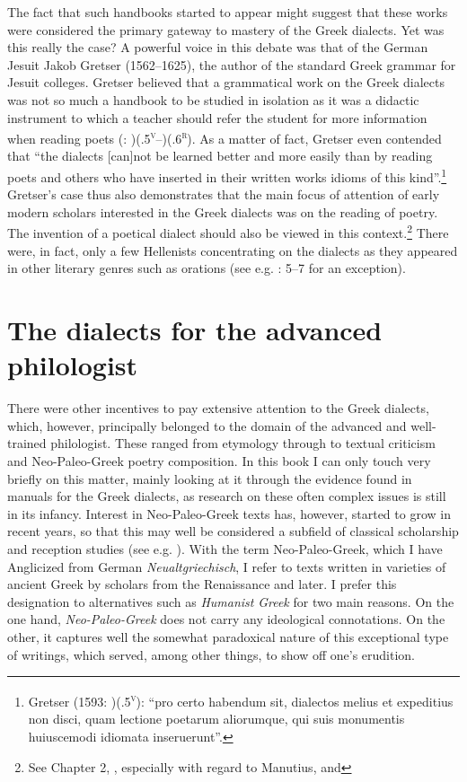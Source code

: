 The fact that such handbooks started to appear might suggest that these works were considered the primary gateway to mastery of the Greek dialects. Yet was this really the case? A powerful voice in this debate was that of the German Jesuit Jakob Gretser (1562–1625), the author of the standard Greek grammar for Jesuit colleges. Gretser believed that a grammatical work on the Greek dialects was not so much a handbook to be studied in isolation as it was a didactic instrument to which a teacher should refer the student for more information when reading poets (\citealt{Gretser1593}: )(.5\textsc{\textsuperscript{v}}–)(.6\textsc{\textsuperscript{r}}). As a matter of fact, Gretser even contended that “the dialects [can]not be learned better and more easily than by reading poets and others who have inserted in their written works idioms of this kind”.\footnote{Gretser (1593: )(.5\textsc{\textsuperscript{v}}): “pro certo habendum sit, dialectos melius et expeditius non disci, quam lectione poetarum aliorumque, qui suis monumentis huiuscemodi idiomata inseruerunt”.} Gretser’s case thus also demonstrates that the main focus of attention of early modern scholars interested in the Greek dialects was on the reading of poetry. The invention of a poetical dialect should also be viewed in this context.\footnote{See Chapter 2, , especially with regard to Manutius, and } There were, in fact, only a few Hellenists concentrating on the dialects as they appeared in other literary genres such as orations (see e.g. \citealt{Labbe1639}: 5–7 for an exception).

\section{The dialects for the advanced philologist}

There were other incentives to pay extensive attention to the Greek dialects, which, however, principally belonged to the domain of the advanced and well-trained philologist. These ranged from etymology through to textual criticism and Neo-Paleo-Greek poetry composition. In this book I can only touch very briefly on this matter, mainly looking at it through the evidence found in manuals for the Greek dialects, as research on these often complex issues is still in its infancy. Interest in Neo-Paleo-Greek texts has, however, started to grow in recent years, so that this may well be considered a subfield of classical scholarship and reception studies (see e.g. \citealt{PällVolt2018}). With the term Neo-Paleo-Greek, which I have Anglicized from German \textit{Neualtgriechisch}, I refer to texts written in varieties of ancient Greek by scholars from the Renaissance and later. I prefer this designation to alternatives such as \textit{Humanist} \textit{Greek} for two main reasons. On the one hand, \textit{Neo-Paleo-Greek} does not carry any ideological connotations. On the other, it captures well the somewhat paradoxical nature of this exceptional type of writings, which served, among other things, to show off one’s erudition.

